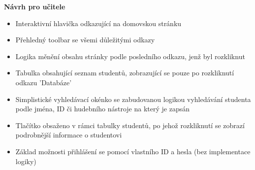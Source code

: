 \documentclass[a4paper, 11pt, twocolumn]{article}
\begin{document}
	\newpage

	\noindent\textbf{Návrh pro učitele} 
	\begin{itemize}
		\item Interaktivní hlavička odkazující na domovskou stránku
		\vspace{-0.2cm}
		\item Přehledný toolbar se všemi důležitými odkazy
		\vspace{-0.2cm}
		\item Logika měnění obsahu stránky podle posledního odkazu, jenž byl rozkliknut
		\vspace{-0.2cm}
		\item Tabulka obsahující seznam studentů, zobrazující se pouze po rozkliknutí odkazu 'Databáze'
		\vspace{-0.2cm}
		\item Simplistické vyhledávací okénko se zabudovanou logikou vyhledávání studenta podle jména, ID či hudebního nástroje na který je zapsán
		\vspace{-0.2cm}
		\item Tlačítko obsaženo v rámci tabulky studentů, po jehož rozkliknutí se zobrazí podrobnější informace o studentovi
		\vspace{-0.2cm}
		\item Základ možnosti přihlášení se pomocí vlastního ID a hesla (bez implementace logiky)
	\end{itemize}


	\vspace*{\fill}
	\newpage
\end{document}
